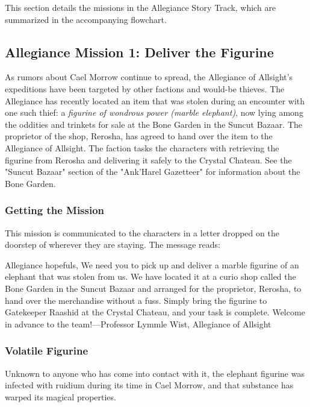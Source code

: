 \documentclass[a4paper, 11pt, bg=full, twocolumn, nooutline]{dndbook}
\begin{document}
This section details the missions in the Allegiance Story Track, which are summarized in the accompanying flowchart.



\subsection{Allegiance Mission 1: Deliver the Figurine}

As rumors about Cael Morrow continue to spread, the Allegiance of Allsight's expeditions have been targeted by other factions and would-be thieves. The Allegiance has recently located an item that was stolen during an encounter with one such thief: a \textit{figurine of wondrous power (marble elephant)}, now lying among the oddities and trinkets for sale at the Bone Garden in the Suncut Bazaar. The proprietor of the shop, Rerosha, has agreed to hand over the item to the Allegiance of Allsight. The faction tasks the characters with retrieving the figurine from Rerosha and delivering it safely to the Crystal Chateau. See the "Suncut Bazaar" section of the "Ank'Harel Gazetteer" for information about the Bone Garden.

\subsubsection{Getting the Mission}

This mission is communicated to the characters in a letter dropped on the doorstep of wherever they are staying. The message reads:

\begin{DndReadAloud}
Allegiance hopefuls,
We need you to pick up and deliver a marble figurine of an elephant that was stolen from us. We have located it at a curio shop called the Bone Garden in the Suncut Bazaar and arranged for the proprietor, Rerosha, to hand over the merchandise without a fuss. Simply bring the figurine to Gatekeeper Raashid at the Crystal Chateau, and your task is complete.
Welcome in advance to the team!---Professor Lymmle Wist, Allegiance of Allsight
\end{DndReadAloud}

\subsubsection{Volatile Figurine}

Unknown to anyone who has come into contact with it, the elephant figurine was infected with ruidium during its time in Cael Morrow, and that substance has warped its magical properties.
\end{document}
